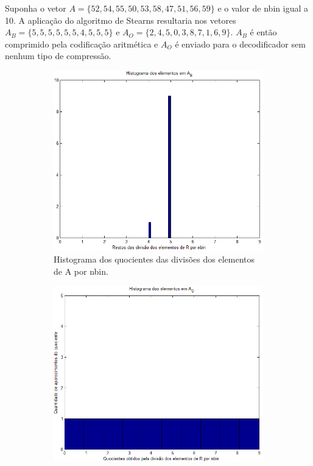 Suponha o vetor $A = \{52, 54, 55, 50, 53, 58, 47, 51, 56, 59\}$ e o valor de
nbin igual a 10. A aplicação do algoritmo de Stearns resultaria nos vetores
$A_B = \{5, 5, 5, 5, 5, 5, 4, 5, 5, 5\}$ e $A_O = \{2, 4, 5, 0, 3, 8, 7, 1, 6,
9\}$. $A_B$ é então comprimido pela codificação aritmética e $A_O$ é enviado
para o decodificador sem nenhum tipo de compressão.

\begin{figure}[ht]
\centering
\begin{subfigure}{.49\textwidth}
  \centering
  \includegraphics[width=1\linewidth]{fig/histxb.png}  
  \caption{Histograma dos quocientes das divisões dos elementos de A por nbin.}
  \label{fig:histab}
\end{subfigure}%
\hfill
\begin{subfigure}{.49\textwidth}
  \centering
  \includegraphics[width=1\linewidth]{fig/histxo.png}

\end{subfigure}
\end{figure}
